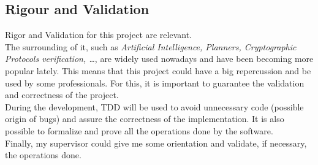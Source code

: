 \subsection{Rigour and Validation}
Rigor and Validation for this project are relevant. \\
The surrounding of it, such as \emph{Artificial Intelligence, Planners, Cryptographic Protocols verification, \ldots}, are widely used nowadays and have been becoming more popular lately. This means that this project could have a big repercussion and be used by some professionals. For this, it is important to guarantee the validation and correctness of the project. \\
During the development, TDD will be used to avoid unnecessary code (possible origin of bugs) and assure the correctness of the implementation. It is also possible to formalize and prove all the operations done by the software.\\
Finally, my supervisor could give me some orientation and validate, if necessary, the operations done.